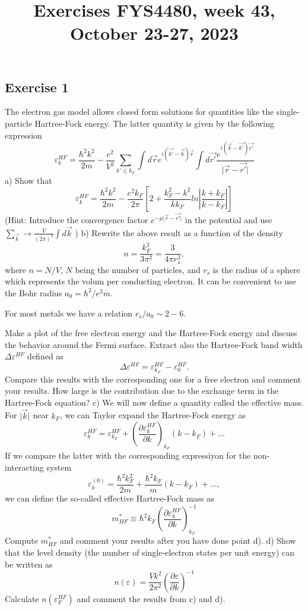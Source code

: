 \documentclass[prc]{revtex4}
\begin{document}
\title{Exercises FYS4480, week 43, October 23-27, 2023}
\maketitle



\subsection*{Exercise 1}
The electron gas model allows closed form solutions for quantities like the 
single-particle Hartree-Fock energy.  The latter quantity is given by the following expression
\[
\varepsilon_{k}^{HF}=\frac{\hbar^{2}k^{2}}{2m}-\frac{e^{2}}
{V^{2}}\sum_{k'\leq
k_{F}}\int d\vec{r}e^{i(\vec{k'}-\vec{k})\vec{r}}\int
d\vec{r'}\frac{e^{i(\vec{k}-\vec{k'})\vec{r'}}}
{\vert\vec{r}-\vec{r'}\vert}
\]
a) Show that
\[
\varepsilon_{k}^{HF}=\frac{\hbar^{2}k^{2}}{2m}-\frac{e^{2}
k_{F}}{2\pi}
\left[
2+\frac{k_{F}^{2}-k^{2}}{kk_{F}}ln\left\vert\frac{k+k_{F}}
{k-k_{F}}\right\vert
\right]
\]
(Hint: Introduce the convergence factor 
$e^{-\mu\vert\vec{r}-\vec{r'}\vert}$
in the potential and use  $\sum_{\vec{k}}\rightarrow
\frac{V}{(2\pi)^{3}}\int d\vec{k}$ )
\newline
b) Rewrite the above result as a function of the density
\[
n= \frac{k_F^3}{3\pi^2}=\frac{3}{4\pi r_s^3},
\]
where $n=N/V$, $N$ being the number of particles, and $r_s$ is the radius of a sphere which represents the volum per conducting electron.  
It can be convenient to use the Bohr radius $a_0=\hbar^2/e^2m$.

For most metals we have a relation $r_s/a_0\sim 2-6$.

Make a plot of the free electron energy and the Hartree-Fock energy
and discuss the behavior around the Fermi surface. Extract also  
the Hartree-Fock band width $\Delta\varepsilon^{HF}$ defined as
\[ \Delta\varepsilon^{HF}=\varepsilon_{k_{F}}^{HF}-
\varepsilon_{0}^{HF}.\]
Compare this results with the corresponding one for a free electron and comment
your results. How large is the contribution due to the exchange term in the Hartree-Fock equation?\newline
c) We will now define a quantity called the effective mass.
For $\vert\vec{k}\vert$ near $k_{F}$, we can Taylor expand the Hartree-Fock energy as  
\[
\varepsilon_{k}^{HF}=\varepsilon_{k_{F}}^{HF}+
\left(\frac{\partial
\varepsilon_{k}^{HF}}{\partial k}\right)_{k_{F}}(k-k_{F})+\dots
\]
If we compare the latter with the corresponding expressiyon for the non-interacting system
\[
\varepsilon_{k}^{(0)}=\frac{\hbar^{2}k^{2}_{F}}{2m}+
\frac{\hbar^{2}k_{F}}{m}\left(k-k_{F}\right)+\dots ,
\]
we can define the so-called effective Hartree-Fock mass as
\[
m_{HF}^{*}\equiv\hbar^{2}k_{F}\left(
\frac{\partial\varepsilon_{k}^{HF}}
{\partial k}\right)_{k_{F}}^{-1}
\]
Compute $m_{HF}^{*}$ and comment your results after you have done 
point d). \newline
d) Show that the level density (the number of single-electron states
per unit energy) can be written as
\[
n(\varepsilon)=\frac{Vk^{2}}{2\pi^{2}}\left(
\frac{\partial\varepsilon}{\partial k}\right)^{-1}
\]
Calculate $n(\varepsilon_{F}^{HF})$ and comment the results from c) and d).
\end{document}

